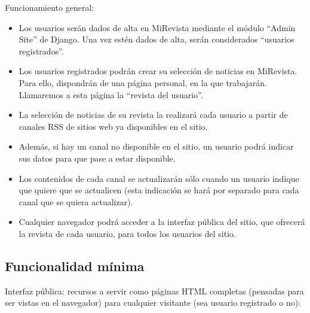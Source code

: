 Funcionamiento general:

\begin{itemize}
\item Los usuarios serán dados de alta en MiRevista mediante el módulo ``Admin Site'' de Django. Una vez estén dados de alta, serán considerados ``usuarios registrados''.

\item Los usuarios registrados podrán crear su selección de noticias en MiRevista. Para ello, dispondrán de una página personal, en la que trabajarán. Llamaremos a esta página la ``revista del usuario''.

\item La selección de noticias de su revista la realizará cada usuario a partir de canales RSS de sitios web ya disponibles en el sitio.

\item Además, si hay un canal no disponible en el sitio, un usuario podrá indicar sus datos para que pase a estar disponible.

\item Los contenidos de cada canal se actualizarán sólo cuando un usuario indique que quiere que se actualicen (esta indicación se hará por separado para cada canal que se quiera actualizar).

\item Cualquier navegador podrá acceder a la interfaz pública del sitio, que ofrecerá la revista de cada usuario, para todos los usuarios del sitio.
\end{itemize}


\subsection{Funcionalidad mínima}

Interfaz pública: recursos a servir como páginas HTML completas (pensadas para ser vistas en el navegador) para cualquier visitante (sea usuario registrado o no):


